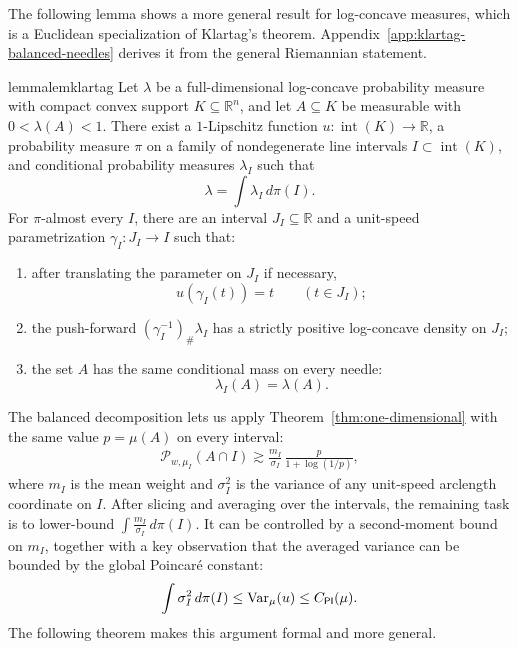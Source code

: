 \documentclass[11pt]{article}
\theoremstyle{definition}
\theoremstyle{remark}
\newcommand{\R}{\mathbb R}
\newcommand{\cP}{\mathcal P}
\begin{document}
The following lemma shows a more general result for log-concave measures, which is a Euclidean specialization of Klartag's theorem.  Appendix~\ref{app:klartag-balanced-needles} derives it from the general Riemannian statement.


\begin{restatable}{lemma}{lemklartag}\label{lem:balanced-needles}
Let $\lambda$ be a full-dimensional log-concave probability measure with compact convex support $K\subseteq\R^n$, and let $A\subseteq K$ be measurable with $0<\lambda(A)<1$.  There exist a $1$-Lipschitz function $u:{\operatorname{int}(K)}\to\R$, a probability measure $\pi$ on a family of nondegenerate line intervals $I\subset{\operatorname{int}(K)}$, and conditional probability measures $\lambda_I$ such that
\begin{equation}\label{eq:balanced-needle-disintegration}
 \lambda=\int\lambda_I\,d\pi(I).
\end{equation}
For $\pi$-almost every $I$, there are an interval $J_I\subseteq\R$ and a unit-speed parametrization $\gamma_I:J_I\to I$ such that:
\begin{enumerate}[label=\textup{(\roman*)},leftmargin=2.2em]
\item after translating the parameter on $J_I$ if necessary,
\begin{equation}\label{eq:guiding-coordinate-on-needle}
 u(\gamma_I(t))=t\qquad(t\in J_I);
\end{equation}
\item the push-forward $(\gamma_I^{-1})_\#\lambda_I$ has a strictly positive log-concave density on $J_I$;
\item the set $A$ has the same conditional mass on every needle:
\begin{equation}\label{eq:balanced-needle-mass}
 \lambda_I(A)=\lambda(A).
\end{equation}
\end{enumerate}
\end{restatable}

The balanced decomposition lets us apply Theorem~\ref{thm:one-dimensional} with the same value $p=\mu(A)$ on every interval:
\begin{align*}
    \cP_{w,\mu_I}(A\cap I)\gtrsim\frac{m_I}{\sigma_I}\,\frac{p}{1+\log(1/p)},
\end{align*}
where $m_I$ is the mean weight and $\sigma_I^2$ is the variance of any unit-speed arclength
coordinate on $I$. After slicing and averaging over the intervals, the remaining task is to lower-bound \(\int \frac{m_I}{\sigma_I}\,d\pi(I)\). It can be controlled by a second-moment bound on $m_I$, together with a key observation that the averaged variance can be bounded by the global Poincar\'e constant:
\begin{align*}
    \int\sigma_I^2\,d\pi(I) \le \operatorname{Var}_\mu(u) \le C_{\sf PI}(\mu).
\end{align*}
The following theorem makes this argument formal and more general. 
\end{document}
